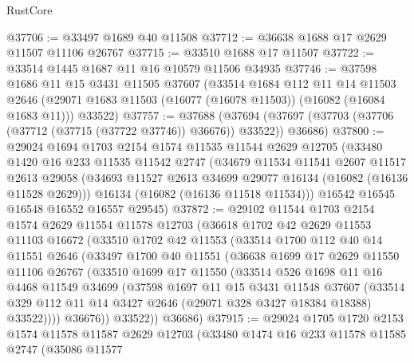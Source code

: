 \begin{lexlean}{RustCore}
\begin{coremodule}
@37706 := @33497 @1689 @40 @11508
@37712 := @36638 @1688 @17 @2629 @11507 @11106 @26767
@37715 := @33510 @1688 @17 @11507
@37722 := @33514 @1445 @1687 @11 @16 @10579 @11506 @34935
@37746 := @37598
    @1686
    @11
    @15
    @3431
    @11505
    @37607
    (@33514
      @1684
      @112
      @11
      @14
      @11503
      @2646
      (@29071 @1683 @11503 (@16077 (@16078 @11503)) (@16082 (@16084 @1683 @11)))
      @33522)
@37757 := @37688
    (@37694 (@37697 (@37703 (@37706 (@37712 (@37715 (@37722 @37746)) @36676)) @33522)) @36686)
@37800 := @29024
    @1694
    @1703
    @2154
    @1574
    @11535
    @11544
    @2629
    @12705
    (@33480
      @1420
      @16
      @233
      @11535
      @11542
      @2747
      (@34679
        @11534
        @11541
        @2607
        @11517
        @2613
        @29058
        (@34693 @11527 @2613 @34699 @29077 @16134 (@16082 (@16136 @11528 @2629)))
        @16134
        (@16082 (@16136 @11518 @11534)))
      @16542
      @16545
      @16548
      @16552
      @16557
      @29545)
@37872 := @29102
    @11544
    @1703
    @2154
    @1574
    @2629
    @11554
    @11578
    @12703
    (@36618
      @1702
      @42
      @2629
      @11553
      @11103
      @16672
      (@33510
        @1702
        @42
        @11553
        (@33514
          @1700
          @112
          @40
          @14
          @11551
          @2646
          (@33497
            @1700
            @40
            @11551
            (@36638
              @1699
              @17
              @2629
              @11550
              @11106
              @26767
              (@33510
                @1699
                @17
                @11550
                (@33514
                  @526
                  @1698
                  @11
                  @16
                  @4468
                  @11549
                  @34699
                  (@37598
                    @1697
                    @11
                    @15
                    @3431
                    @11548
                    @37607
                    (@33514
                      @329
                      @112
                      @11
                      @14
                      @3427
                      @2646
                      (@29071 @328 @3427 @18384 @18388)
                      @33522))))
              @36676))
          @33522))
      @36686)
@37915 := @29024
    @1705
    @1720
    @2153
    @1574
    @11578
    @11587
    @2629
    @12703
    (@33480
      @1474
      @16
      @233
      @11578
      @11585
      @2747
      (@35086
        @11577

\end{coremodule}
\end{lexlean}
